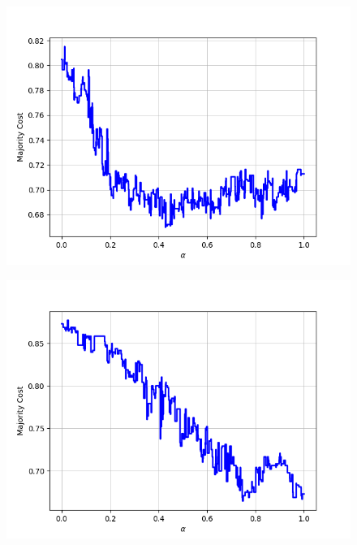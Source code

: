 \begin{figure}[H]
\begin{minipage}{.24\textwidth}
  {\includegraphics[width=\linewidth]{plots/omniglot-intra-ac/Futurama}}
\end{minipage}
\begin{minipage}{.24\textwidth}
  \centering
  {\includegraphics[width=\linewidth]{plots/omniglot-intra-ac/Grantha}}
\end{minipage}
\begin{minipage}{.24\textwidth}
  \centering

\end{minipage}
\end{figure}
